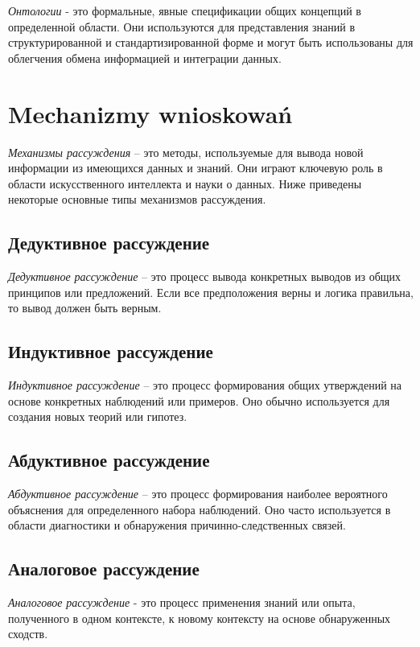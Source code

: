 \textit{Онтологии} - это формальные, явные спецификации общих концепций в определенной области. Они используются для представления знаний в структурированной и стандартизированной форме и могут быть использованы для облегчения обмена информацией и интеграции данных.


\section{Mechanizmy wnioskowań}
\textit{Механизмы рассуждения} – это методы, используемые для вывода новой информации из имеющихся данных и знаний. Они играют ключевую роль в области искусственного интеллекта и науки о данных. Ниже приведены некоторые основные типы механизмов рассуждения.

\subsection{Дедуктивное рассуждение}

\textit{Дедуктивное рассуждение} – это процесс вывода конкретных выводов из общих принципов или предложений. Если все предположения верны и логика правильна, то вывод должен быть верным.

\subsection{Индуктивное рассуждение}

\textit{Индуктивное рассуждение} – это процесс формирования общих утверждений на основе конкретных наблюдений или примеров. Оно обычно используется для создания новых теорий или гипотез.

\subsection{Абдуктивное рассуждение}

\textit{Абдуктивное рассуждение} – это процесс формирования наиболее вероятного объяснения для определенного набора наблюдений. Оно часто используется в области диагностики и обнаружения причинно-следственных связей.

\subsection{Аналоговое рассуждение}

\textit{Аналоговое рассуждение} - это процесс применения знаний или опыта, полученного в одном контексте, к новому контексту на основе обнаруженных сходств.

